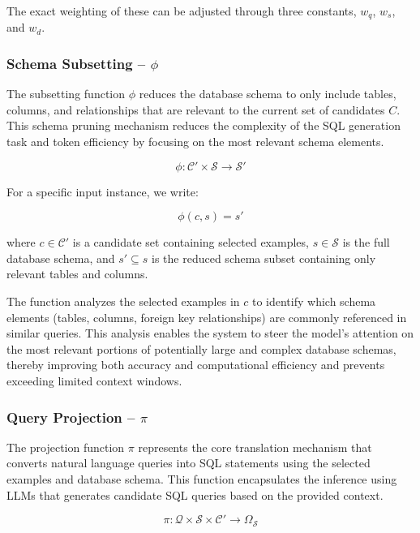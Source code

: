 The exact weighting of these can be adjusted through three constants, $w_q$, $w_s$, and $w_d$.

\subsubsection{Schema Subsetting – $\phi$}\label{design:subsetting-function}

The subsetting function $\phi$ reduces the database schema to only include
tables, columns, and relationships that are relevant to the current set of candidates
$C$. This schema pruning mechanism reduces the complexity of the SQL generation task
and token efficiency by focusing on the most relevant schema elements.

$$
\phi: \mathcal{C}' \times \mathcal{S} \rightarrow \mathcal{S}'
$$

\vspace{0.5em}

For a specific input instance, we write:

$$
\phi(c, s) = s'
$$

\vspace{0.5em}

where $c \in \mathcal{C}'$ is a candidate set containing selected examples, $s \in \mathcal{S}$
is the full database schema, and $s' \subseteq s$ is the reduced schema subset containing
only relevant tables and columns.

The function analyzes the selected examples in $c$ to identify which schema elements
(tables, columns, foreign key relationships) are commonly referenced in similar queries.
This analysis enables the system to steer the model's attention on the most relevant
portions of potentially large and complex database schemas, thereby improving both accuracy
and computational efficiency and prevents exceeding limited context windows.

\subsubsection{Query Projection – $\pi$}\label{design:projection-function}

The projection function $\pi$ represents the core translation mechanism that converts
natural language queries into SQL statements using the selected examples and database
schema. This function encapsulates the inference using LLMs that generates
candidate SQL queries based on the provided context.

$$
\pi: \mathcal{Q} \times \mathcal{S} \times \mathcal{C}' \rightarrow \Omega_{\mathcal{S}}
$$

